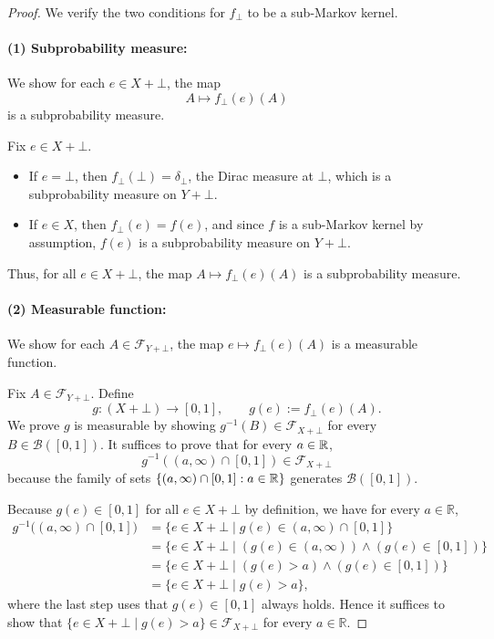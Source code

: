 \begin{proof}
	We verify the two conditions for $f_{\bot}$ to be a sub-Markov kernel.
	
	\paragraph{(1) Subprobability measure:}
	We show for each $e \in X + \bot$, the map 
	\[
		A \mapsto f_{\bot}(e)(A)
	\]
	is a subprobability measure.

	Fix $e \in X + \bot$. 
	\begin{itemize}
	\item If $e = \bot$, then $f_{\bot}(\bot) = \delta_{\bot}$, the Dirac measure at $\bot$, which is a subprobability measure on $Y + \bot$.
	
	\item If $e \in X$, then $f_{\bot}(e) = f(e)$, and since $f$ is a sub-Markov kernel by assumption, $f(e)$ is a subprobability measure on $Y + \bot$.
	\end{itemize}
	
	Thus, for all $e \in X + \bot$, the map $A \mapsto f_{\bot}(e)(A)$ is a subprobability measure.
	
	\paragraph{(2) Measurable function:}
	We show for each $A \in \mathcal{F}_{Y + \bot}$, the map $e \mapsto f_{\bot}(e)(A)$ is a measurable function.

	Fix $A \in \mathcal{F}_{Y + \bot}$. Define
	\[
		g \colon (X + \bot) \to [0,1], \qquad g(e) := f_{\bot}(e)(A).
	\]
	We prove $g$ is measurable by showing $g^{-1}(B) \in \mathcal{F}_{X + \bot}$ for every $B \in \mathcal{B}([0,1])$. It suffices to prove that for every $a \in \mathbb{R}$,
	\[
		g^{-1}((a,\infty) \cap [0,1]) \in \mathcal{F}_{X + \bot}
	\]
	because the family of sets $\{(a,\infty) \cap [0,1] : a \in \mathbb{R}\}$ generates $\mathcal{B}([0,1])$. 

	Because $g(e)\in[0,1]$ for all $e\in X+\bot$ by definition, we have for every $a\in\mathbb{R}$,
	\begin{align*}
		g^{-1}\big((a,\infty)\cap[0,1]\big)
		&= \{e\in X+\bot \mid g(e)\in (a,\infty)\cap[0,1]\} \\
		&= \{e\in X+\bot \mid (g(e)\in (a,\infty)) \wedge (g(e)\in [0,1])\} \\
		&= \{e\in X+\bot \mid (g(e)>a) \wedge (g(e)\in [0,1])\} \\
		&= \{e\in X+\bot \mid g(e)>a\},
	\end{align*}
	where the last step uses that $g(e)\in[0,1]$ always holds.
	Hence it suffices to show that $\{e\in X+\bot \mid g(e)>a\}\in\mathcal{F}_{X+\bot}$
	for every $a\in\mathbb{R}$.


\end{proof}
